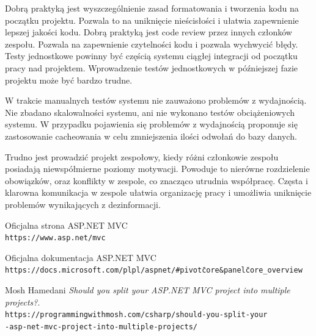 \documentclass{article}
\begin{document}
Dobrą praktyką jest wyszczególnienie zasad formatowania i tworzenia kodu na początku projektu. Pozwala to na uniknięcie nieścisłości i ułatwia zapewnienie lepszej jakości kodu. Dobrą praktyką jest code review przez innych członków zespołu. Pozwala na zapewnienie czytelności kodu i pozwala wychwycić błędy. Testy jednostkowe powinny być częścią systemu ciągłej integracji od początku pracy nad projektem. Wprowadzenie testów jednostkowych w późniejszej fazie projektu może być bardzo trudne.

W trakcie manualnych testów systemu nie zauważono problemów z wydajnością. Nie zbadano skalowalności systemu, ani nie wykonano testów obciążeniowych systemu. W przypadku pojawienia się problemów z wydajnością proponuje się zastosowanie cacheowania w celu zmniejszenia ilości odwołań do bazy danych.

Trudno jest prowadzić projekt zespołowy, kiedy różni członkowie zespołu posiadają niewspółmierne poziomy motywacji. Powoduje to nierówne rozdzielenie obowiązków, oraz konflikty w zespole, co znacząco utrudnia współpracę. Częsta i klarowna komunikacja w zespole ułatwia organizację pracy i umożliwia uniknięcie problemów wynikających z dezinformacji.

\newpage
\begin{thebibliography}{9}

Oficjalna strona ASP.NET MVC
\\\texttt{https://www.asp.net/mvc}

Oficjalna dokumentacja ASP.NET MVC
\\\texttt{https://docs.microsoft.com/pl\-pl/aspnet/\#pivot\=core\&panel\=core\_overview}

Mosh Hamedani
\textit{Should you split your ASP.NET MVC project into multiple projects?}.
\\\texttt{https://programmingwithmosh.com/csharp/should-you-split-your\\-asp-net-mvc-project-into-multiple-projects/}

\end{thebibliography}
\end{document}

